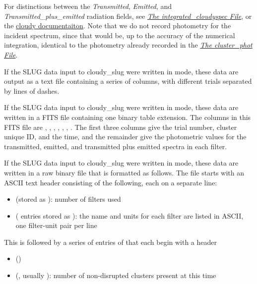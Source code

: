 \documentclass[letterpaper,10pt,english]{sphinxmanual}
\begin{document}
For distinctions between the \emph{Transmitted}, \emph{Emitted}, and
\emph{Transmitted\_plus\_emitted} radiation fields, see
{\hyperref[cloudy:sssec\string-int\string-cloudyspec\string-file]{\emph{The integrated\_cloudyspec File}}}, or the \href{http://nublado.org}{cloudy documentaiton}. Note that we do not record photometry for the
incident spectrum, since that would be, up to the accuracy of the
numerical integration, identical to the photometry already recorded in
the {\hyperref[output:ssec\string-cluster\string-phot\string-file]{\emph{The cluster\_phot File}}}.

If the SLUG data input to cloudy\_slug were written in  mode,
these data are output as a text file containing a series of columns,
with different trials separated by lines of dashes.

If the SLUG data input to cloudy\_slug were written in  mode,
these data are written in a FITS file containing one binary table
extension. The columns in this FITS file are , ,
, , ,
, . The first three columns
give the trial number, cluster unique ID, and the time, and the
remainder give the photometric values for the transmitted, emitted,
and transmitted plus emitted spectra in each filter.

If the SLUG data input to cloudy\_slug were written in  mode,
these data are written in a raw binary file that is formatted as
follows. The file starts with an ASCII text header consisting of the
following, each on a separate line:
\begin{itemize}
\item {} 
 (stored as ): number of filters used

\item {} 
  ( entries stored as ): the name and units for each filter are listed in ASCII, one
filter-unit pair per line

\end{itemize}

This is followed by a series of entries of that each begin with a
header
\begin{itemize}
\item {} 
 ()

\item {} 
 (, usually ): number of non-disrupted clusters present at this time

\end{itemize}
\end{document}

